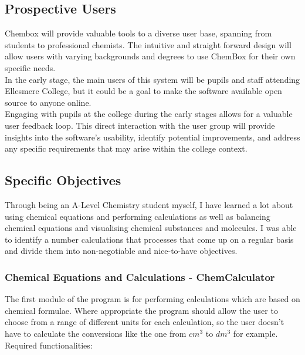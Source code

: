\documentclass[a4paper,12pt]{article}
\begin{document}
\newpage

\subsection{Prospective Users}

Chembox will provide valuable tools to a diverse user base, spanning from students to professional chemists. The intuitive and straight forward design will allow users with varying backgrounds and degrees to use ChemBox for their own specific needs.\\
In the early stage, the main users of this system will be pupils and staff attending Ellesmere College, but it could be a goal to make the software available open source to anyone online.\\
Engaging with pupils at the college during the early stages allows for a valuable user feedback loop. This direct interaction with the user group will provide insights into the software's usability, identify potential improvements, and address any specific requirements that may arise within the college context.


\subsection{Specific Objectives}

Through being an A-Level Chemistry student myself, I have learned a lot about using chemical equations and performing calculations as well as balancing chemical equations and visualising chemical substances and molecules. I was able to identify a number calculations that processes that come up on a regular basis and divide them into non-negotiable and nice-to-have objectives.

\subsubsection{Chemical Equations and Calculations - ChemCalculator}

The first module of the program is for performing  calculations which are based on chemical formulae.
Where appropriate the program should allow the user to choose from a range of different units for each calculation, so the user doesn't have to calculate the conversions like the one from $cm^{3}$ to $dm^{3}$ for example.\\
\linebreak
Required functionalities:\\
\linebreak
\end{document}
